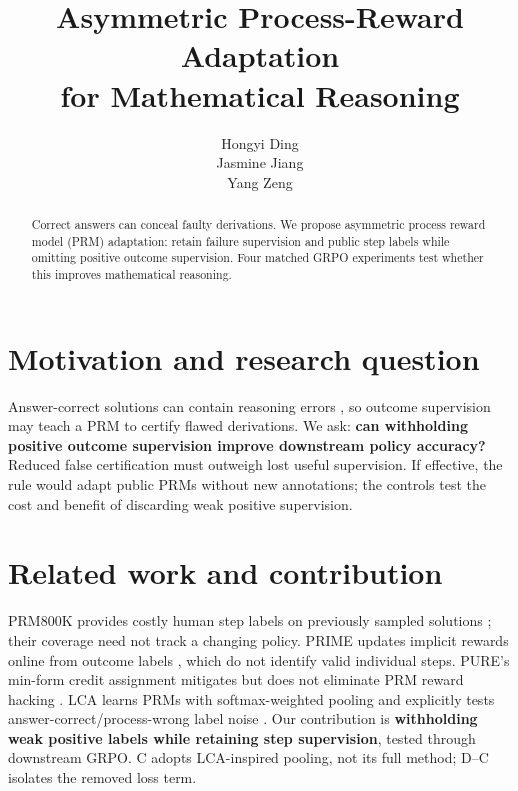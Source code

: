 \documentclass{article}
\title{Asymmetric Process-Reward Adaptation\\for Mathematical Reasoning}
\author{
Hongyi Ding \\
\And
Jasmine Jiang \\
\And
Yang Zeng \\
}
\begin{document}
\maketitle
\begin{abstract}
Correct answers can conceal faulty derivations. We propose asymmetric process reward model (PRM) adaptation: retain failure supervision and public step labels while omitting positive outcome supervision. Four matched GRPO experiments test whether this improves mathematical reasoning.
\end{abstract}

\section{Motivation and research question}
Answer-correct solutions can contain reasoning errors \citep{zheng2025}, so outcome supervision may teach a PRM to certify flawed derivations. We ask: \textbf{can withholding positive outcome supervision improve downstream policy accuracy?} Reduced false certification must outweigh lost useful supervision. If effective, the rule would adapt public PRMs without new annotations; the controls test the cost and benefit of discarding weak positive supervision.

\section{Related work and contribution}
PRM800K provides costly human step labels on previously sampled solutions \citep{lightman2023}; their coverage need not track a changing policy. PRIME updates implicit rewards online from outcome labels \citep{cui2025}, which do not identify valid individual steps. PURE's min-form credit assignment mitigates but does not eliminate PRM reward hacking \citep{cheng2025}. LCA learns PRMs with softmax-weighted pooling and explicitly tests answer-correct/process-wrong label noise \citep{jia2026}. Our contribution is \textbf{withholding weak positive labels while retaining step supervision}, tested through downstream GRPO. C adopts LCA-inspired pooling, not its full method; D--C isolates the removed loss term.
\end{document}
